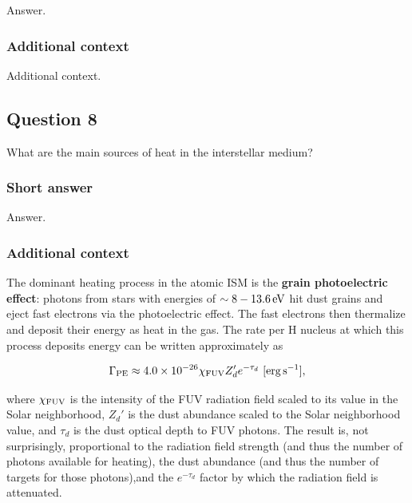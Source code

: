 \documentclass[a4paper,10pt]{article}
\begin{document}
Answer.

\subsubsection{Additional context}

Additional context.


\newpage
\subsection{Question 8}

What are the main sources of heat in the interstellar medium?

\subsubsection{Short answer}

Answer.

\subsubsection{Additional context}

The dominant heating process in the atomic ISM is the \textbf{grain photoelectric effect}: photons from stars with energies of $\sim8-13.6\,{\rm eV}$ hit dust grains and eject fast electrons via the photoelectric effect. The fast electrons then thermalize and deposit their energy as heat in the gas. The rate per H nucleus at which this process deposits energy can be written approximately as

\begin{align*}
    \Gamma_{\rm PE} \approx 4.0\times10^{-26}\chi_{\rm FUV}Z_d'e^{-\tau_d} ~ [{\rm erg\,s^{-1}}],
\end{align*}

{\noindent}where $\chi_{\rm FUV}$ is the intensity of the FUV radiation field scaled to its value in the Solar neighborhood, $Z_d'$ is the dust abundance scaled
to the Solar neighborhood value, and $\tau_d$ is the dust optical depth to FUV photons. The result is, not surprisingly, proportional to the radiation field strength (and thus the number of photons available for heating), the dust abundance (and thus the number of targets for those photons),and the $e^{-\tau_d}$ factor by which the radiation field is attenuated.
\end{document}
